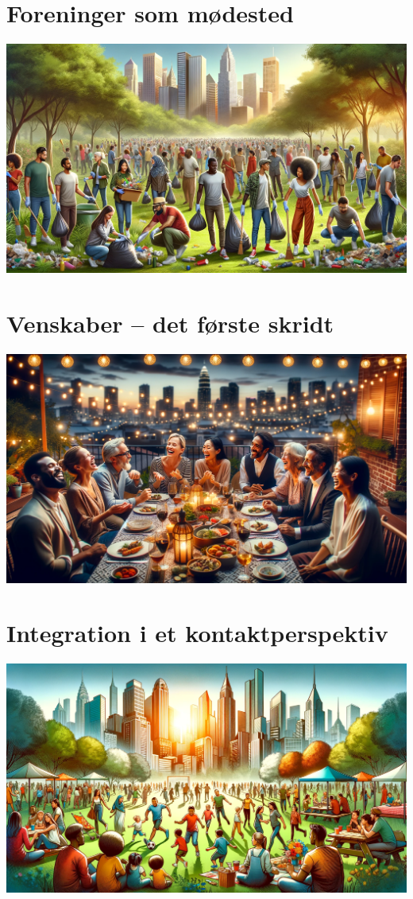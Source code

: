 \documentclass[
]{book}
\begin{document}
\chapter{Foreninger som mødested}\label{kap5}

\includegraphics[width=1\linewidth]{images/dalle-civil}

\chapter{Venskaber -- det første skridt}\label{kap6}

\includegraphics[width=1\linewidth]{images/dalle-friendships}

\chapter{Integration i et kontaktperspektiv}\label{kap7}

\includegraphics[width=1\linewidth]{images/dalle-integration}
\end{document}
